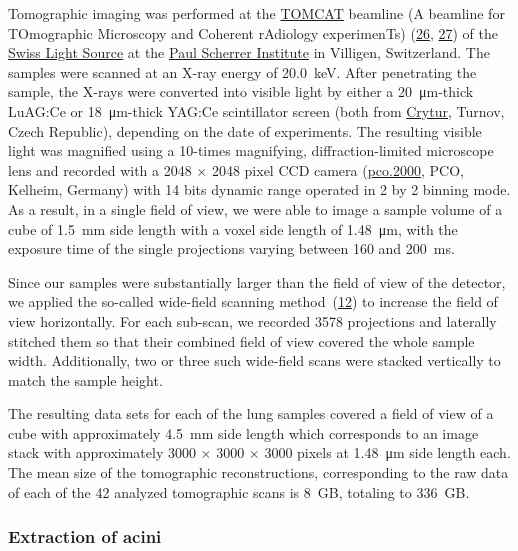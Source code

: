 \documentclass[
  american,
]{article}
\begin{document}
Tomographic imaging was performed at the \href{https://www.psi.ch/sls/tomcat/}{TOMCAT} beamline (A beamline for TOmographic Microscopy and Coherent rAdiology experimenTs) (\protect\hyperlink{ref-knMAkPPz}{26}, \protect\hyperlink{ref-Cp0VRmEj}{27}) of the \href{https://www.psi.ch/sls/}{Swiss Light Source} at the \href{https://www.psi.ch/}{Paul Scherrer Institute} in Villigen, Switzerland.
The samples were scanned at an X-ray energy of 20.0~keV.
After penetrating the sample, the X-rays were converted into visible light by either a 20~μm-thick LuAG:Ce or 18~μm-thick YAG:Ce scintillator screen (both from \href{http://www.crytur.cz/}{Crytur}, Turnov, Czech Republic), depending on the date of experiments.
The resulting visible light was magnified using a 10-times magnifying, diffraction-limited microscope lens and recorded with a 2048 × 2048 pixel CCD camera (\href{https://www.pco.de/specialized-cameras/pco2000/}{pco.2000}, PCO, Kelheim, Germany) with 14 bits dynamic range operated in 2 by 2 binning mode.
As a result, in a single field of view, we were able to image a sample volume of a cube of 1.5~mm side length with a voxel side length of 1.48~μm, with the exposure time of the single projections varying between 160 and 200~ms.

Since our samples were substantially larger than the field of view of the detector, we applied the so-called wide-field scanning method~(\protect\hyperlink{ref-VELl7OiR}{12}) to increase the field of view horizontally.
For each sub-scan, we recorded 3578 projections and laterally stitched them so that their combined field of view covered the whole sample width.
Additionally, two or three such wide-field scans were stacked vertically to match the sample height.

The resulting data sets for each of the lung samples covered a field of view of a cube with approximately 4.5~mm side length which corresponds to an image stack with approximately 3000 × 3000 × 3000 pixels at 1.48~μm side length each.
The mean size of the tomographic reconstructions, corresponding to the raw data of each of the 42 analyzed tomographic scans is 8~GB, totaling to 336~GB.

\hypertarget{extraction-of-acini}{%
\subsubsection{Extraction of acini}\label{extraction-of-acini}}
\end{document}
